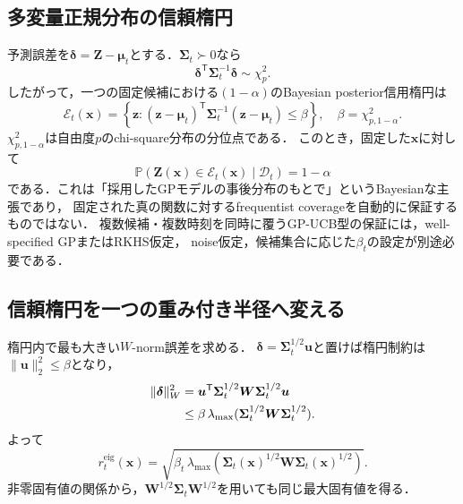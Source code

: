 \documentclass[a4paper,11pt]{ltjsarticle}
\newcommand{\Pp}{\mathbb P}
\newcommand{\D}{\mathcal D}
\newcommand{\T}{\mathsf T}
\begin{document}
\subsection{多変量正規分布の信頼楕円}

予測誤差を\(\bm\delta=\bm Z-\bm\mu_t\)とする．\(\bm\Sigma_t\succ0\)なら
\begin{equation}
  \bm\delta^\T\bm\Sigma_t^{-1}\bm\delta
  \sim\chi_p^2.
  \label{eq:mahalanobis-chi-square}
\end{equation}
したがって，一つの固定候補における\((1-\alpha)\)のBayesian posterior信用楕円は
\begin{equation}
  \mathcal E_t(\bm x)
  =\left\{\bm z:
  (\bm z-\bm\mu_t)^\T\bm\Sigma_t^{-1}
  (\bm z-\bm\mu_t)
  \leq\beta
  \right\},
  \quad
  \beta=\chi^2_{p,1-\alpha}.
  \label{eq:confidence-ellipsoid}
\end{equation}
\(\chi^2_{p,1-\alpha}\)は自由度\(p\)のchi-square分布の分位点である．
このとき，固定した\(\bm x\)に対して
\begin{equation}
  \Pp\!\left(\bm Z(\bm x)\in\mathcal E_t(\bm x)\mid\D_t\right)=1-\alpha
\end{equation}
である．これは「採用したGPモデルの事後分布のもとで」というBayesianな主張であり，
固定された真の関数に対するfrequentist coverageを自動的に保証するものではない．
複数候補・複数時刻を同時に覆うGP-UCB型の保証には，well-specified GPまたはRKHS仮定，
noise仮定，候補集合に応じた\(\beta_t\)の設定が別途必要である．

\subsection{信頼楕円を一つの重み付き半径へ変える}

楕円内で最も大きい\(W\)-norm誤差を求める．
\(\bm\delta=\bm\Sigma_t^{1/2}\bm u\)と置けば楕円制約は\(\|\bm u\|_2^2\leq\beta\)となり，
\begin{align}
  \|\bm\delta\|_W^2
  &=\bm u^\T\bm\Sigma_t^{1/2}\bm W\bm\Sigma_t^{1/2}\bm u\notag\\
  &\leq\beta\,
  \lambda_{\max}(\bm\Sigma_t^{1/2}\bm W\bm\Sigma_t^{1/2}).
  \label{eq:ellipsoid-radius-derivation}
\end{align}
よって
\begin{equation}
  \boxed{
  r_t^{\mathrm{eig}}(\bm x)
  =\sqrt{\beta_t\,
  \lambda_{\max}\left(
  \bm\Sigma_t(\bm x)^{1/2}
  \bm W
  \bm\Sigma_t(\bm x)^{1/2}
  \right)}.}
  \label{eq:eigen-confidence-radius}
\end{equation}
非零固有値の関係から，\(\bm W^{1/2}\bm\Sigma_t\bm W^{1/2}\)を用いても同じ最大固有値を得る．
\end{document}
